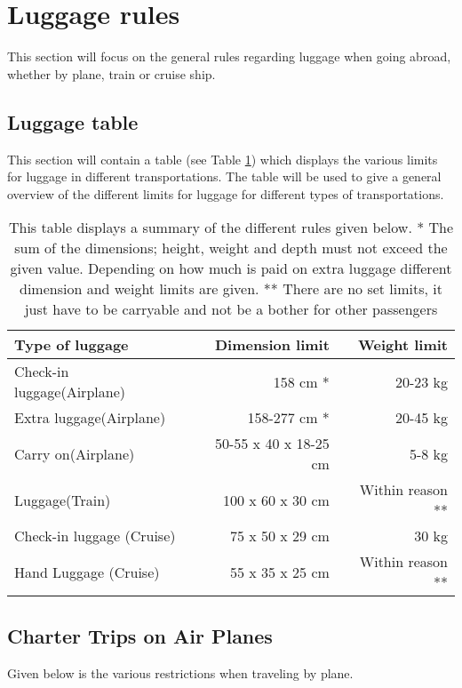 \section{Luggage rules}
\label{sec:LugRules}
This section will focus on the general rules regarding luggage when going abroad, whether by plane, train or cruise ship.
\subsection{Luggage table}
This section will contain a table (see Table \ref{tab:Lug}) which displays the various limits for luggage in different transportations. The table will be used to give a general overview of the different limits for luggage for different types of transportations.
\begin{table}[H]
\begin{tabular}{| l | r | r |}
\hline
Type of luggage &  Dimension limit & Weight limit \\ \hline
Check-in luggage(Airplane) & 158 cm * & 20-23 kg \\ \hline
Extra luggage(Airplane) & 158-277 cm * &  20-45 kg \\ \hline
Carry on(Airplane) & 50-55 x 40 x 18-25 cm & 5-8 kg \\ \hline
Luggage(Train) & 100 x 60 x 30 cm & Within reason **\\ \hline
Check-in luggage (Cruise) & 75 x 50 x 29 cm & 30 kg \\ \hline
Hand Luggage (Cruise) & 55 x 35 x 25 cm & Within reason **\\ \hline
\end{tabular}
\caption{This table displays a summary of the different rules given below.\newline
* The sum of the dimensions; height, weight and depth must not exceed the given value. 
Depending on how much is paid on extra luggage different dimension and weight limits are given.\newline
** There are no set limits, it just have to be carryable and not be a bother for other passengers}
\label{tab:Lug}
\end{table}

\subsection{Charter Trips on Air Planes}
Given below is the various restrictions when traveling by plane.

